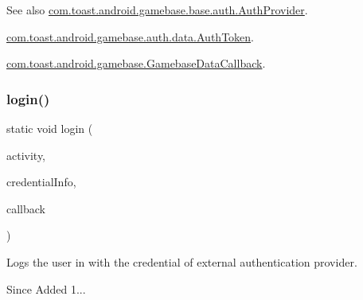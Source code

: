 \begin{DoxySeeAlso}{See also}
\hyperlink{interfacecom_1_1toast_1_1android_1_1gamebase_1_1base_1_1auth_1_1_auth_provider}{com.\+toast.\+android.\+gamebase.\+base.\+auth.\+Auth\+Provider}. 

\hyperlink{classcom_1_1toast_1_1android_1_1gamebase_1_1auth_1_1data_1_1_auth_token}{com.\+toast.\+android.\+gamebase.\+auth.\+data.\+Auth\+Token}. 

\hyperlink{interfacecom_1_1toast_1_1android_1_1gamebase_1_1_gamebase_data_callback}{com.\+toast.\+android.\+gamebase.\+Gamebase\+Data\+Callback}. 
\end{DoxySeeAlso}
\mbox{\label{classcom_1_1toast_1_1android_1_1gamebase_1_1_gamebase_aa9ada2b00de7bcc4f96ba8b85319d444}} 
\subsubsection{\texorpdfstring{login()}{login()}\hspace{0.1cm}{\footnotesize\ttfamily [3/3]}}
{\footnotesize\ttfamily static void login (\begin{DoxyParamCaption}\item[{@Non\+Null final Activity}]{activity,  }\item[{@Non\+Null final Map$<$ String, Object $>$}]{credential\+Info,  }\item[{@Nullable final \hyperlink{interfacecom_1_1toast_1_1android_1_1gamebase_1_1_gamebase_data_callback}{Gamebase\+Data\+Callback}$<$ \hyperlink{classcom_1_1toast_1_1android_1_1gamebase_1_1auth_1_1data_1_1_auth_token}{Auth\+Token} $>$}]{callback }\end{DoxyParamCaption})\hspace{0.3cm}{\ttfamily [static]}}



Logs the user in with the credential of external authentication provider. 

\begin{DoxySince}{Since}
Added 1... 
\end{DoxySince}

